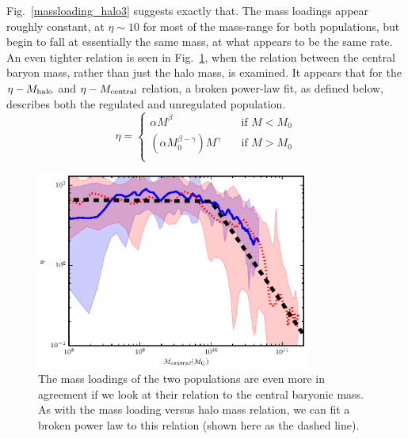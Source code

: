 Fig.~\ref{massloading_halo3} suggests exactly that.  The mass loadings appear
roughly constant, at $\eta\sim10$ for most of the mass-range for both
populations, but begin to fall at essentially the same mass, at what appears to
be the same rate.  An even tighter relation is seen in
Fig.~\ref{massloading_central3}, when the relation between the central baryon
mass, rather than just the halo mass, is examined. It appears that for the
$\eta-M_{\rm halo}$ and $\eta-M_{\rm central}$ relation, a broken power-law fit, as
defined below, describes both the regulated and unregulated population.
\begin{equation}
    \eta = 
    \begin{cases}
        \alpha M^\beta  & \quad \text{if } M < M_0 \\
        (\alpha M_0^{\beta-\gamma}) M^\gamma & \quad \text{if } M > M_0 \\
    \end{cases}
    \label{outflow_scaling3}
\end{equation}
\begin{figure}
    \includegraphics[width=0.8\textwidth]{figures3/massloading_central.eps}
    \caption[Mass loadings as a function of disc mass]{The mass loadings of the two populations are even more in agreement
    if we look at their relation to the central baryonic mass.  As with the mass
    loading versus halo mass relation, we can fit a broken power law to this relation
    (shown here as the dashed line).}
    \label{massloading_central3}
\end{figure}
